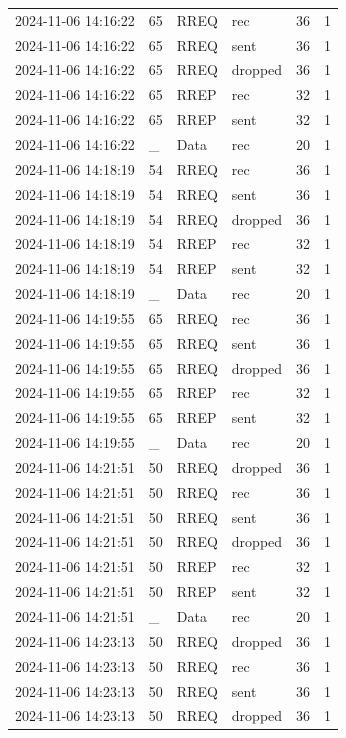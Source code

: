\documentclass[]{nsm-thesis}
\begin{document}
\begin{longtable}{llllll}
2024-11-06 14:16:22 & 65 & RREQ & rec & 36 & 1 \\
2024-11-06 14:16:22 & 65 & RREQ & sent & 36 & 1 \\
2024-11-06 14:16:22 & 65 & RREQ & dropped & 36 & 1 \\
2024-11-06 14:16:22 & 65 & RREP & rec & 32 & 1 \\
2024-11-06 14:16:22 & 65 & RREP & sent & 32 & 1 \\
2024-11-06 14:16:22 & _ & Data & rec & 20 & 1 \\
2024-11-06 14:18:19 & 54 & RREQ & rec & 36 & 1 \\
2024-11-06 14:18:19 & 54 & RREQ & sent & 36 & 1 \\
2024-11-06 14:18:19 & 54 & RREQ & dropped & 36 & 1 \\
2024-11-06 14:18:19 & 54 & RREP & rec & 32 & 1 \\
2024-11-06 14:18:19 & 54 & RREP & sent & 32 & 1 \\
2024-11-06 14:18:19 & _ & Data & rec & 20 & 1 \\
2024-11-06 14:19:55 & 65 & RREQ & rec & 36 & 1 \\
2024-11-06 14:19:55 & 65 & RREQ & sent & 36 & 1 \\
2024-11-06 14:19:55 & 65 & RREQ & dropped & 36 & 1 \\
2024-11-06 14:19:55 & 65 & RREP & rec & 32 & 1 \\
2024-11-06 14:19:55 & 65 & RREP & sent & 32 & 1 \\
2024-11-06 14:19:55 & _ & Data & rec & 20 & 1 \\
2024-11-06 14:21:51 & 50 & RREQ & dropped & 36 & 1 \\
2024-11-06 14:21:51 & 50 & RREQ & rec & 36 & 1 \\
2024-11-06 14:21:51 & 50 & RREQ & sent & 36 & 1 \\
2024-11-06 14:21:51 & 50 & RREQ & dropped & 36 & 1 \\
2024-11-06 14:21:51 & 50 & RREP & rec & 32 & 1 \\
2024-11-06 14:21:51 & 50 & RREP & sent & 32 & 1 \\
2024-11-06 14:21:51 & _ & Data & rec & 20 & 1 \\
2024-11-06 14:23:13 & 50 & RREQ & dropped & 36 & 1 \\
2024-11-06 14:23:13 & 50 & RREQ & rec & 36 & 1 \\
2024-11-06 14:23:13 & 50 & RREQ & sent & 36 & 1 \\
2024-11-06 14:23:13 & 50 & RREQ & dropped & 36 & 1 \\

\end{longtable}
\end{document}
